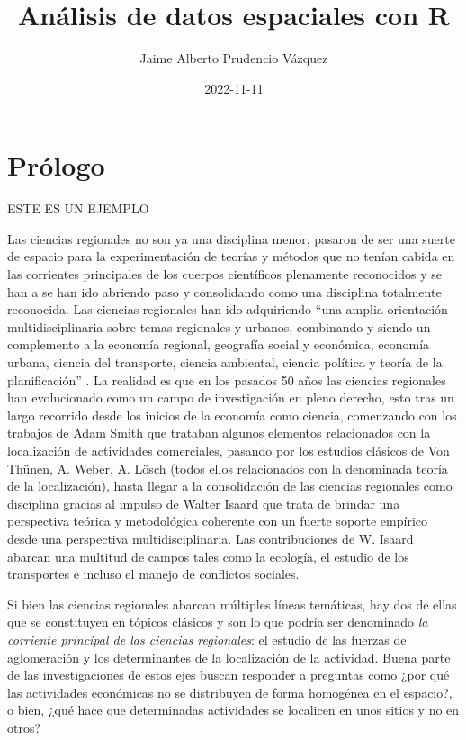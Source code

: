 \documentclass[
  11pt,
  oneside]{book}
\title{Análisis de datos espaciales con R}
\author{Jaime Alberto Prudencio Vázquez}
\date{2022-11-11}
\begin{document}
\maketitle

{
\setcounter{tocdepth}{1}
\tableofcontents
}
\hypertarget{pruxf3logo}{%
\chapter*{Prólogo}\label{pruxf3logo}}

ESTE ES UN EJEMPLO

Las ciencias regionales no son ya una disciplina menor, pasaron de ser una suerte de espacio para la experimentación de teorías y métodos que no tenían cabida en las corrientes principales de los cuerpos científicos plenamente reconocidos y se han a se han ido abriendo paso y consolidando como una disciplina totalmente reconocida. Las ciencias regionales han ido adquiriendo ``una amplia orientación multidisciplinaria sobre temas regionales y urbanos, combinando y siendo un complemento a la economía regional, geografía social y económica, economía urbana, ciencia del transporte, ciencia ambiental, ciencia política y teoría de la planificación'' \citep{Fischer2014}. La realidad es que en los pasados 50 años las ciencias regionales han evolucionado como un campo de investigación en pleno derecho, esto tras un largo recorrido desde los inicios de la economía como ciencia, comenzando con los trabajos de Adam Smith que trataban algunos elementos relacionados con la localización de actividades comerciales, pasando por los estudios clásicos de Von Thünen, A. Weber, A. Lösch (todos ellos relacionados con la denominada teoría de la localización), hasta llegar a la consolidación de las ciencias regionales como disciplina gracias al impulso de \href{https://www.narsc.org/newsite/internal/isard/}{Walter Isaard} que trata de brindar una perspectiva teórica y metodológica coherente con un fuerte soporte empírico desde una perspectiva multidisciplinaria. Las contribuciones de W. Isaard abarcan una multitud de campos tales como la ecología, el estudio de los transportes e incluso el manejo de conflictos sociales.

Si bien las ciencias regionales abarcan múltiples líneas temáticas, hay dos de ellas que se constituyen en tópicos clásicos y son lo que podría ser denominado \emph{la corriente principal de las ciencias regionales}: el estudio de las fuerzas de aglomeración y los determinantes de la localización de la actividad. Buena parte de las investigaciones de estos ejes buscan responder a preguntas como ¿por qué las actividades económicas no se distribuyen de forma homogénea en el espacio?, o bien, ¿qué hace que determinadas actividades se localicen en unos sitios y no en otros?
\end{document}
